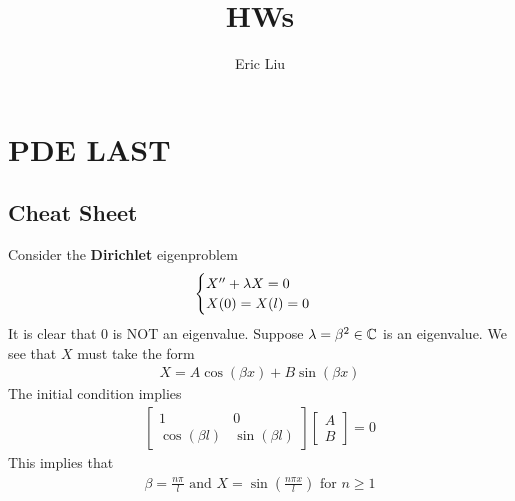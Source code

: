\documentclass{report}
\title{\Huge{HWs}}
\author{\huge{Eric Liu}}
\date{}
\begin{document}
\maketitle
\newpage%
\tableofcontents
\pagebreak
\chapter{PDE LAST}
\section{Cheat Sheet}
\begin{mdframed}
Consider the \textbf{Dirichlet} eigenproblem 
\begin{align*}
\begin{cases}
  X''+ \lambda X=0 \\
  X(0)=X(l)=0
\end{cases}
\end{align*}
It is clear that $0$ is NOT an eigenvalue. Suppose  $\lambda =\beta ^2\in\mathbb{C}$ is an eigenvalue. We see that $X$ must take the form
\begin{align*}
X= A \cos (\beta x)+ B \sin (\beta x)
\end{align*}
The initial condition implies 
\begin{align*}
\begin{bmatrix}
  1 & 0  \\
  \cos (\beta l) & \sin (\beta l)
\end{bmatrix} \begin{bmatrix}
A\\
B
\end{bmatrix}=0 
\end{align*}
This implies that 
\begin{align*}
\beta = \frac{n \pi  }{l}\text{ and } X= \sin ( \frac{n \pi  x}{l})\text{ for }n\geq 1
\end{align*}
\end{mdframed}
\end{document}
